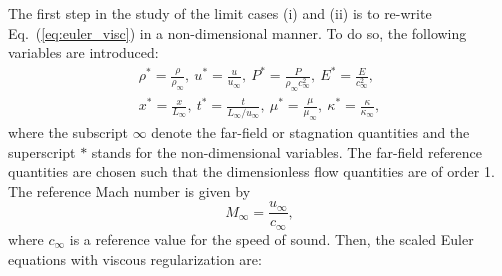 \documentclass[preprint,10pt]{elsarticle}
\newcommand{\eqt}[1]{Eq.~(\ref{#1})}                     %
\newcommand{\sct}[1]{Section~\ref{#1}}                   %
\newcommand{\tcr}[1]{\textcolor{red}{#1}}
\begin{document}
%
The first step in the study of the limit cases (i) and (ii) is to re-write \eqt{eq:euler_visc} in 
a non-dimensional manner. To do so, the following variables are introduced:
%
\begin{multline}
\label{eq:norm_param}
\rho^*   = \frac{\rho}{\rho_\infty}           ,\
u^*      = \frac{u}{u_\infty}                 ,\
P^*      = \frac{P}{\rho_\infty c^2_\infty}   ,\
E^*      = \frac{E}{c^2_\infty }              ,\\
x^* = \frac{x}{L_\infty}                      ,\
t^* = \frac{t}{L_\infty / u_\infty}           ,\ 
\mu^*    = \frac{\mu}{\mu_\infty}             ,\
\kappa^* = \frac{\kappa}{\kappa_\infty}       ,
\end{multline}
%
where  the subscript $\infty$ denote the far-field or stagnation quantities and the superscript $*$ 
stands for the non-dimensional variables. The far-field reference quantities are chosen such that the 
dimensionless flow quantities are of order 1. The reference Mach number is given by
%
\begin{equation}
M_\infty = \frac{u_\infty}{c_\infty} ,
\end{equation}
%
where $c_\infty$ is a reference value for the speed of sound. Then, the scaled Euler equations with viscous regularization are:
%
\end{document}
